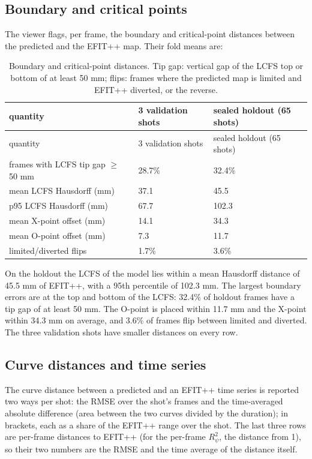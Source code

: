 \documentclass[11pt,a4paper]{article}
\numberwithin{equation}{section}
\begin{document}
\hypertarget{boundary-and-critical-points}{%
\subsection{Boundary and critical points}\label{boundary-and-critical-points}}

The viewer flags, per frame, the boundary and critical-point distances between the predicted and the EFIT++ map. Their fold means are:

\begin{longtable}[]{@{}lll@{}}
\caption{Boundary and critical-point distances. Tip gap: vertical gap of the LCFS top or bottom of at least 50 mm; flips: frames where the predicted map is limited and EFIT++ diverted, or the reverse.}\tabularnewline
\toprule\noalign{}
quantity & 3 validation shots & sealed holdout (65 shots) \\
\midrule\noalign{}
\endfirsthead
\toprule\noalign{}
quantity & 3 validation shots & sealed holdout (65 shots) \\
\midrule\noalign{}
\endhead
\bottomrule\noalign{}
\endlastfoot
frames with LCFS tip gap \(\ge\) 50 mm & 28.7\% & 32.4\% \\
mean LCFS Hausdorff (mm) & 37.1 & 45.5 \\
p95 LCFS Hausdorff (mm) & 67.7 & 102.3 \\
mean X-point offset (mm) & 14.1 & 34.3 \\
mean O-point offset (mm) & 7.3 & 11.7 \\
limited/diverted flips & 1.7\% & 3.6\% \\
\end{longtable}

On the holdout the LCFS of the model lies within a mean Hausdorff distance of 45.5 mm of EFIT++, with a 95th percentile of 102.3 mm. The largest boundary errors are at the top and bottom of the LCFS: 32.4\% of holdout frames have a tip gap of at least 50 mm. The O-point is placed within 11.7 mm and the X-point within 34.3 mm on average, and 3.6\% of frames flip between limited and diverted. The three validation shots have smaller distances on every row.

\hypertarget{curve-distances-and-time-series}{%
\subsection{Curve distances and time series}\label{curve-distances-and-time-series}}

The curve distance between a predicted and an EFIT++ time series is reported two ways per shot: the RMSE over the shot's frames and the time-averaged absolute difference (area between the two curves divided by the duration); in brackets, each as a share of the EFIT++ range over the shot. The last three rows are per-frame distances to EFIT++ (for the per-frame \(R^2_\psi\), the distance from 1), so their two numbers are the RMSE and the time average of the distance itself.
\end{document}
